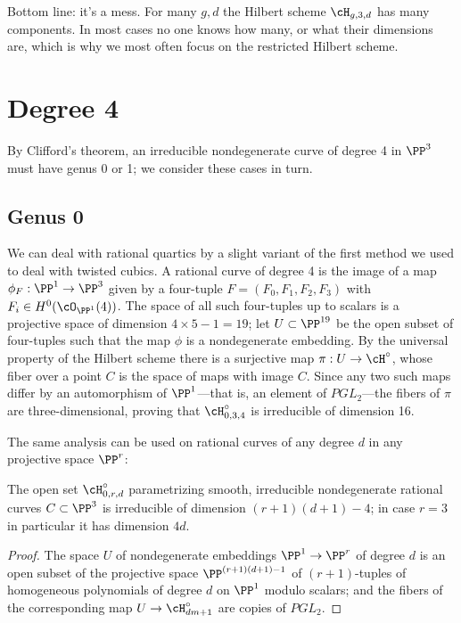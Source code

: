 Bottom line: it's a mess. For many $g,d$ the Hilbert scheme $\cH_{g,3,d}$ has many components. In most cases no one knows how many, or what their dimensions are, which is why we most often focus on the restricted Hilbert scheme. 

\section{Degree 4}

By Clifford's theorem, an irreducible nondegenerate curve of degree 4 in $\PP^{3}$ must have genus 0 or 1; we consider these cases in turn.

\subsection{Genus 0}\label{degree 4 genus 0}

We can deal with rational quartics by a slight variant of the first method we used to deal with twisted cubics. A rational curve of degree 4 is the image of a map $\phi_F : \PP^1 \to \PP^3$ given by a four-tuple $F = (F_0,F_1,F_2,F_3)$ with $F_i \in H^0(\cO_{\PP^1}(4))$. The space of all such four-tuples up to scalars is a projective space of dimension $4 \times 5 - 1 = 19$; let $U \subset \PP^{19}$ be the open subset of four-tuples such that the map $\phi$ is a nondegenerate embedding. By the universal property of the Hilbert scheme there is a surjective map $\pi : U \to \cH^\circ$, whose fiber over a point $C$ is the space of maps with image $C$. Since any two such maps differ by an automorphism of $\PP^1$---that is, an element of $PGL_2$---the fibers of $\pi$ are three-dimensional, proving that $\cH^\circ_{0,3,4}$ is irreducible of dimension 16. 

The same analysis can be used on rational curves of any degree $d$ in any projective space $\PP^r$:

\begin{proposition}\label{dimension of rational curves}
The open set $\cH^\circ_{0,r,d}$ parametrizing smooth, irreducible nondegenerate rational curves $C \subset \PP^3$ is irreducible of dimension $(r+1)(d+1)-4$; in case $r=3$ in particular it has dimension $4d$.
\end{proposition}

\begin{proof}
The space $U$ of nondegenerate embeddings $\PP^1 \to \PP^r$ of degree $d$ is an open subset of the projective space $\PP^{(r+1)(d+1)-1}$ of $(r+1)$-tuples of homogeneous polynomials of degree $d$ on $\PP^1$ modulo scalars; and the fibers of the corresponding map $U \to \cH^\circ_{dm+1}$ are copies of $PGL_2$. 
\end{proof}

